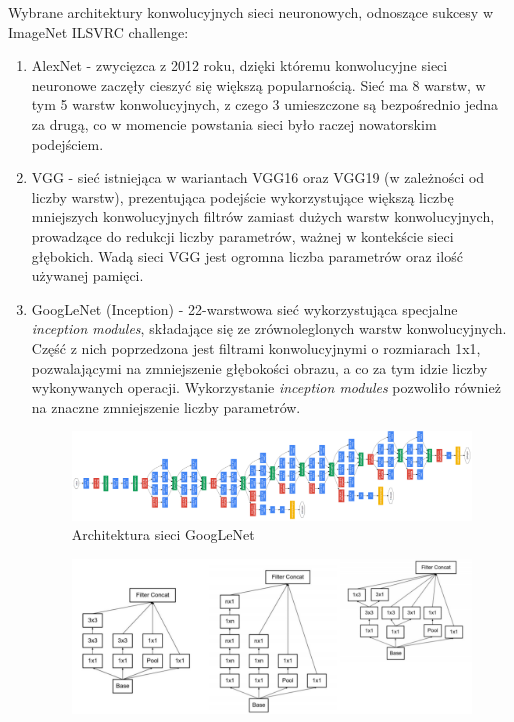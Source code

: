 \documentclass[polish,12pt]{aghthesis}
\begin{document}
\vspace{5mm}
\par
Wybrane architektury konwolucyjnych sieci neuronowych, odnoszące sukcesy w ImageNet ILSVRC challenge:
\begin{enumerate}
    \item AlexNet - zwycięzca z 2012 roku, dzięki któremu konwolucyjne sieci neuronowe zaczęły cieszyć się większą popularnością. Sieć ma 8 warstw, w tym 5 warstw konwolucyjnych, z czego 3 umieszczone są bezpośrednio jedna za drugą, co w momencie powstania sieci było raczej nowatorskim podejściem.
    \item VGG - sieć istniejąca w wariantach VGG16 oraz VGG19 (w zależności od liczby warstw), prezentująca podejście wykorzystujące większą liczbę mniejszych konwolucyjnych filtrów zamiast dużych warstw konwolucyjnych, prowadzące do redukcji liczby parametrów, ważnej w kontekście sieci głębokich. Wadą sieci VGG jest ogromna liczba parametrów oraz ilość używanej pamięci.
    \item GoogLeNet (Inception) - 22-warstwowa sieć wykorzystująca specjalne \textit{inception modules}, składające się ze zrównoleglonych warstw konwolucyjnych. Część z nich poprzedzona jest filtrami konwolucyjnymi o rozmiarach 1x1, pozwalającymi na zmniejszenie głębokości obrazu, a co za tym idzie liczby wykonywanych operacji. Wykorzystanie \textit{inception modules} pozwoliło również na znaczne zmniejszenie liczby parametrów.
        \begin{figure}[ht]
        \centering
        \includegraphics[width=16cm]{images/inception.png}
        \caption{Architektura sieci GoogLeNet\cite{artSzegedy}}
        \end{figure}
        \begin{figure}[ht]
        \centering
        \label{fig:googlenet-architecture}
        \includegraphics[width=15cm]{images/inception_module.PNG}

\end{figure}
\end{enumerate}
\end{document}
